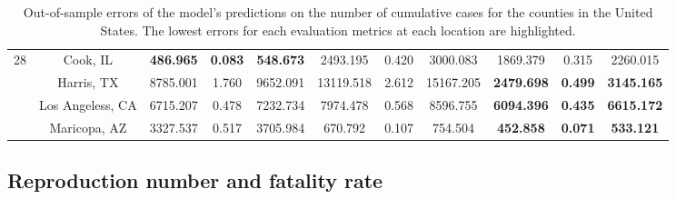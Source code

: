 \begin{landscape}
\begin{table}[!htb]
\begin{tabular}{| c | c | c | c | c | c | c | c | c | c | c |}
        \multirow{4}{*}{28}
            & Cook, IL & \textbf{486.965} & \textbf{0.083} & \textbf{548.673} & 2493.195 & 0.420 & 3000.083 & 1869.379 & 0.315 & 2260.015 \\
            & Harris, TX & 8785.001 & 1.760 & 9652.091 & 13119.518 & 2.612 & 15167.205 & \textbf{2479.698} & \textbf{0.499} & \textbf{3145.165} \\
            & Los Angeless, CA & 6715.207 & 0.478 & 7232.734 & 7974.478 & 0.568 & 8596.755 & \textbf{6094.396} & \textbf{0.435} & \textbf{6615.172} \\
            & Maricopa, AZ & 3327.537 & 0.517 & 3705.984 & 670.792 & 0.107 & 754.504 & \textbf{452.858} & \textbf{0.071} & \textbf{533.121} \\ \hline
    \end{tabular}
    \caption{Out-of-sample errors of the model's predictions on the number of cumulative cases for the counties in the United States. The lowest errors for each evaluation metrics at each location are highlighted.}
    \label{tab:errors-us-counties-total-cases}
\end{table}
\end{landscape}

\subsection{Reproduction number and fatality rate}

